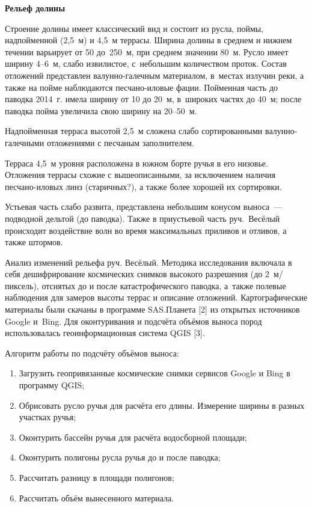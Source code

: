 \textbf{Рельеф долины}

Строение долины имеет классический вид и состоит из русла, поймы, надпойменной (2,5~м) и 4,5~м террасы. Ширина долины в среднем и нижнем течении варьирует от 50 до~250~м, при среднем значении 80~м. Русло имеет ширину 4--6~м, слабо извилистое, с~небольшим количеством проток. Состав отложений представлен валунно-галечным материалом, в~местах излучин реки, а также на пойме наблюдаются песчано-иловые фации. Пойменная часть до паводка 2014~г. имела ширину от 10 до 20~м, в широких частях до 40~м; после паводка пойма увеличила свою ширину на 20--50~м.

Надпойменная терраса высотой 2,5~м сложена слабо сортированными валунно-галечными отложениями с песчаным заполнителем.

Терраса 4,5~м уровня расположена в южном борте ручья в его низовье. Отложения террасы схожие с вышеописанными, за исключением наличия песчано-иловых линз (старичных?), а также более хорошей их сортировки.

Устьевая часть слабо развита, представлена небольшим конусом выноса~--- подводной дельтой (до паводка). Также в приустьевой часть руч.~Весёлый происходит воздействие волн во время максимальных приливов и отливов, а также штормов.

Анализ изменений рельефа руч. Весёлый.
Методика исследования включала в себя дешифрирование космических снимков высокого разрешения (до 2 м/пиксель), отснятых до и после катастрофического паводка, а~также полевые наблюдения для замеров высоты террас и описание отложений. Картографические материалы были скачаны в программе SAS.Планета [2] из открытых источников Google и~Bing. Для оконтуривания и подсчёта объёмов выноса пород использовалась геоинформационная система QGIS [3].

Алгоритм работы по подсчёту объёмов выноса:
\begin{enumerate}[noitemsep]\vspace{-8pt}
  \item Загрузить геопривязанные космические снимки сервисов Google и Bing в программу QGIS;
  \item Обрисовать русло ручья для расчёта его длины. Измерение ширины в разных участках ручья;
  \item Оконтурить бассейн ручья для расчёта водосборной площади;
  \item Оконтурить полигоны русла ручья до и после паводка;
  \item Рассчитать разницу в площади полигонов;
  \item Рассчитать объём вынесенного материала.
\end{enumerate}\vspace{-8pt}

